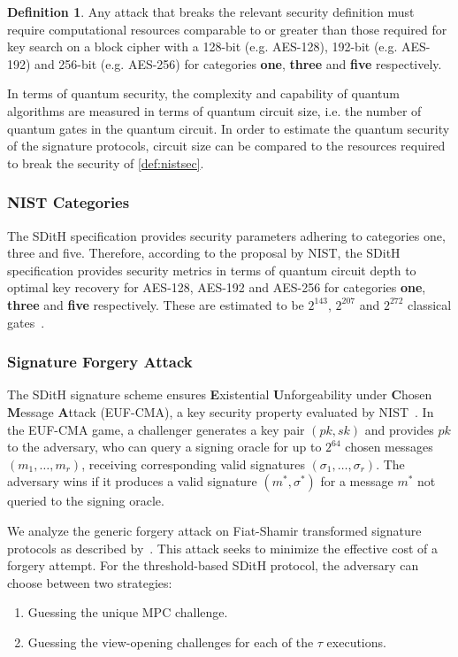 \documentclass[11pt]{report}
\theoremstyle{definition}
\newtheorem{definition}{Definition}[section]
\theoremstyle{plain}
\begin{document}
\begin{definition}\label{def:nistsec}
  Any attack that breaks the relevant security definition must require computational resources comparable to or greater than those required for key search on a block cipher with a 128-bit (e.g. AES-128), 192-bit (e.g. AES-192) and 256-bit (e.g. AES-256) for categories \textbf{one}, \textbf{three} and \textbf{five} respectively.
\end{definition}

In terms of quantum security, the complexity and capability of quantum algorithms are measured in terms of quantum circuit size, i.e. the number of quantum gates in the quantum circuit. In order to estimate the quantum security of the signature protocols, circuit size can be compared to the resources required to break the security of \autoref{def:nistsec}.

\subsubsection{NIST Categories}

The SDitH specification provides security parameters adhering to categories one, three and five. Therefore, according to the proposal by NIST, the SDitH specification provides security metrics in terms of quantum circuit depth to optimal key recovery for AES-128, AES-192 and AES-256 for categories \textbf{one}, \textbf{three} and \textbf{five} respectively. These are estimated to be $2^{143}$, $2^{207}$ and $2^{272}$ classical gates~\cite{nistcall}.

\subsubsection{Signature Forgery Attack}

The SDitH signature scheme ensures \textbf{E}xistential \textbf{U}nforgeability under \textbf{C}hosen \textbf{M}essage \textbf{A}ttack (EUF-CMA), a key security property evaluated by NIST~\cite{nistcall,aguilarsyndrome11}. In the EUF-CMA game, a challenger generates a key pair $(pk, sk)$ and provides $pk$ to the adversary, who can query a signing oracle for up to $2^{64}$ chosen messages $(m_1, \dots, m_r)$, receiving corresponding valid signatures $(\sigma_1, \dots, \sigma_r)$. The adversary wins if it produces a valid signature $(m^*, \sigma^*)$ for a message $m^*$ not queried to the signing oracle.

We analyze the generic forgery attack on Fiat-Shamir transformed signature protocols as described by~\cite{kales2020attack}. This attack seeks to minimize the effective cost of a forgery attempt. For the threshold-based SDitH protocol, the adversary can choose between two strategies:
\begin{enumerate}
  \item \label{item:guessing-mpc-challenge} Guessing the unique MPC challenge.
  \item \label{item:guessing-view-challenge} Guessing the view-opening challenges for each of the $\tau$ executions.
\end{enumerate}
\end{document}
